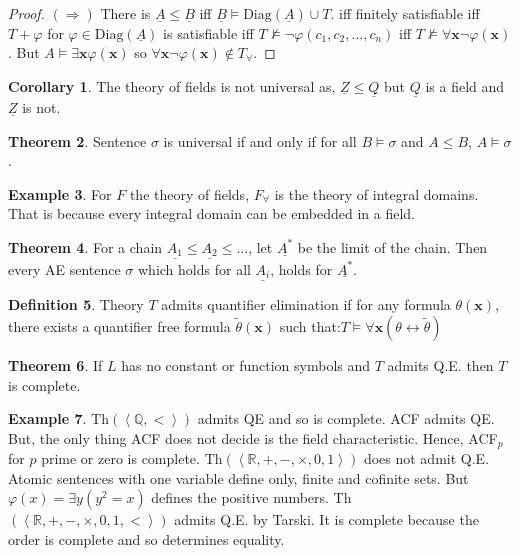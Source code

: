 \documentclass[a4paper,10pt]{article}
\theoremstyle{definition}
\newtheorem{theorem}{Theorem}
\newtheorem{definition}[theorem]{Definition}
\newtheorem{example}[theorem]{Example}
\newtheorem{corollary}[theorem]{Corollary}
\let\vec\mathbf
\let\phi\varphi
\let\leq\leqslant
\begin{document}
\begin{proof}
    $(\Rightarrow)$ There is $\underline{A} \leq \underline{B}$ iff $\underline{B} \models \mathrm{Diag}(\underline{A}) \cup T$. iff finitely satisfiable iff $T + \phi$ for $\phi \in \mathrm{Diag}(\underline{A})$ is satisfiable iff $T \nvDash \neg \phi(c_1, c_2, \ldots, c_n)$ iff $T \nvDash \forall \vec{x} \neg \phi(\vec{x}) $. But $A \models \exists \vec{x} \phi(\vec{x})$ so $\forall \vec{x} \neg \phi(\vec{x}) \notin T_\forall$.
\end{proof}


\begin{corollary}
    The theory of fields is not universal as, $\underline{Z} \leqslant \underline{Q}$ but $\underline{Q}$ is a field and $\underline{Z}$ is not.
\end{corollary}

\begin{theorem}
    Sentence $\sigma$ is universal if and only if for all $B \models \sigma$ and $A \leqslant B$, $A \models \sigma$.
\end{theorem}

\begin{example}
    For $F$ the theory of fields, $F_\forall$ is the theory of integral domains.
    That is because every integral domain can be embedded in a field.
\end{example}

\begin{theorem}
    For a chain $\underline{A_1} \leqslant \underline{A_2} \leqslant \ldots$, let $\underline{A^*}$ be the limit of the chain. Then every AE sentence $\sigma$ which holds for all $\underline{A_i}$, holds for $\underline{A^*}$.
\end{theorem}

\begin{definition}
    Theory $T$ admits quantifier elimination if for any formula $\theta(\vec{x})$, there exists a quantifier free formula $\tilde{\theta}(\vec{x})$ such that:$
        T \models \forall \vec{x} (\theta \leftrightarrow \tilde{\theta})
    $
\end{definition}

\begin{theorem}
    If $L$ has no constant or function symbols and $T$ admits Q.E. then $T$ is complete.
\end{theorem}

\begin{example}
     Th$(\left\langle \mathbb{Q}, < \right\rangle )$ admits QE and so is complete. ACF admits QE. But, the only thing ACF does not decide is the field characteristic. Hence, ACF$_p$ for $p$ prime or zero is complete. Th$(\left\langle \mathbb{R}, +, -, \times, 0, 1\right\rangle )$ does not admit Q.E. Atomic sentences with one variable define only, finite and cofinite sets. But $\varphi(x) = \exists y (y^2 = x)$ defines the positive numbers. Th$(\left\langle \mathbb{R}, +, -, \times, 0, 1, < \right\rangle )$ admits Q.E. by Tarski. It is complete because the order is complete and so determines equality.
\end{example}
\end{document}
